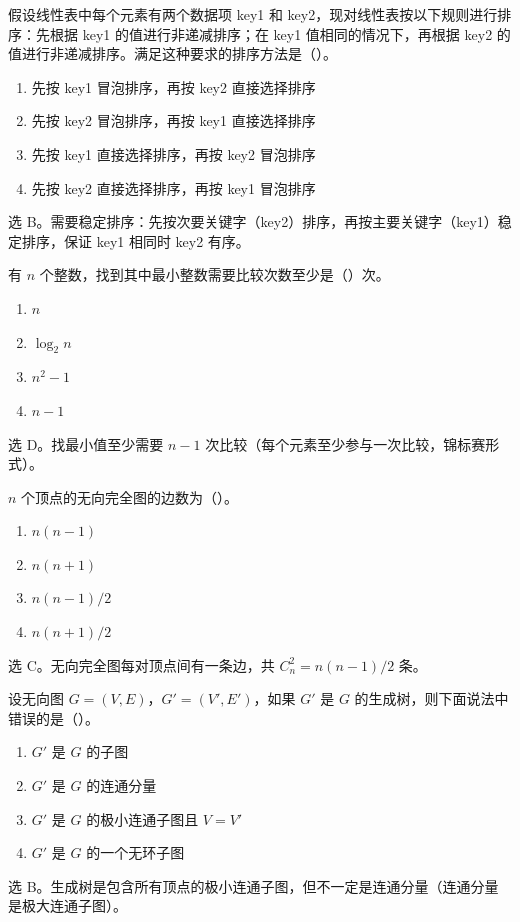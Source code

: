 \begin{question}
假设线性表中每个元素有两个数据项 key1 和 key2，现对线性表按以下规则进行排序：先根据 key1 的值进行非递减排序；在 key1 值相同的情况下，再根据 key2 的值进行非递减排序。满足这种要求的排序方法是（\quad）。
\begin{enumerate}
  \item 先按 key1 冒泡排序，再按 key2 直接选择排序
  \item 先按 key2 冒泡排序，再按 key1 直接选择排序
  \item 先按 key1 直接选择排序，再按 key2 冒泡排序
  \item 先按 key2 直接选择排序，再按 key1 冒泡排序
\end{enumerate}
\begin{solution}
选 B。需要稳定排序：先按次要关键字（key2）排序，再按主要关键字（key1）稳定排序，保证 key1 相同时 key2 有序。
\end{solution}
\end{question}

\begin{question}
有 $n$ 个整数，找到其中最小整数需要比较次数至少是（\quad）次。
\begin{enumerate}
  \item $n$
  \item $\log_2 n$
  \item $n^2-1$
  \item $n-1$
\end{enumerate}
\begin{solution}
选 D。找最小值至少需要 $n-1$ 次比较（每个元素至少参与一次比较，锦标赛形式）。
\end{solution}
\end{question}

\begin{question}
$n$ 个顶点的无向完全图的边数为（\quad）。
\begin{enumerate}
  \item $n(n-1)$
  \item $n(n+1)$
  \item $n(n-1)/2$
  \item $n(n+1)/2$
\end{enumerate}
\begin{solution}
选 C。无向完全图每对顶点间有一条边，共 $C_n^2 = n(n-1)/2$ 条。
\end{solution}
\end{question}

\begin{question}
设无向图 $G=(V,E)$，$G'=(V',E')$，如果 $G'$ 是 $G$ 的生成树，则下面说法中错误的是（\quad）。
\begin{enumerate}
  \item $G'$ 是 $G$ 的子图
  \item $G'$ 是 $G$ 的连通分量
  \item $G'$ 是 $G$ 的极小连通子图且 $V=V'$
  \item $G'$ 是 $G$ 的一个无环子图
\end{enumerate}
\begin{solution}
选 B。生成树是包含所有顶点的极小连通子图，但不一定是连通分量（连通分量是极大连通子图）。
\end{solution}
\end{question}

